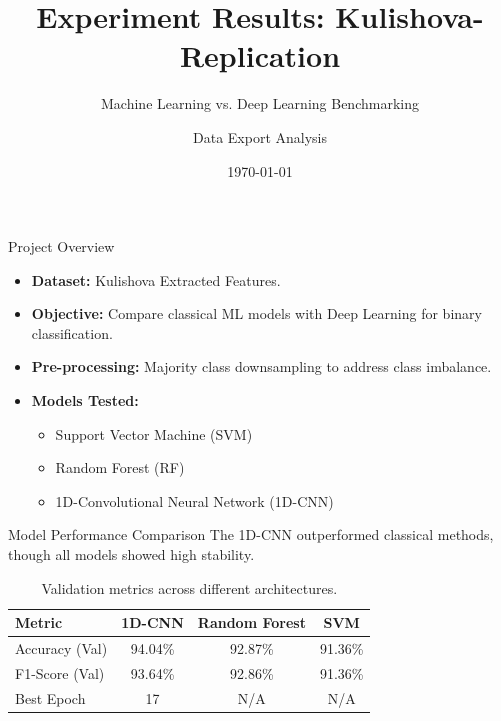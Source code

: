 \documentclass[10pt]{beamer}
\title{Experiment Results: Kulishova-Replication}
\subtitle{Machine Learning vs. Deep Learning Benchmarking}
\date{\today}
\author{Data Export Analysis}
\institute{W&B Project: Binary Classification}
\begin{document}
\maketitle

\begin{frame}{Project Overview}
    \begin{itemize}
        \item \textbf{Dataset:} Kulishova Extracted Features.
        \item \textbf{Objective:} Compare classical ML models with Deep Learning for binary classification.
        \item \textbf{Pre-processing:} Majority class downsampling to address class imbalance.
        \item \textbf{Models Tested:} 
            \begin{itemize}
                \item Support Vector Machine (SVM)
                \item Random Forest (RF)
                \item 1D-Convolutional Neural Network (1D-CNN)
            \end{itemize}
    \end{itemize}
\end{frame}

\begin{frame}{Model Performance Comparison}
    The 1D-CNN outperformed classical methods, though all models showed high stability.
    \vspace{0.5cm}
    \begin{table}
        \centering
        \begin{tabular}{lccc}
            \toprule
            \textbf{Metric} & \textbf{1D-CNN} & \textbf{Random Forest} & \textbf{SVM} \\
            \midrule
            Accuracy (Val) & 94.04\% & 92.87\% & 91.36\% \\
            F1-Score (Val) & 93.64\% & 92.86\% & 91.36\% \\
            Best Epoch & 17 & N/A & N/A \\
            \bottomrule
        \end{tabular}
        \caption{Validation metrics across different architectures.}
    \end{table}
\end{frame}
\end{document}
